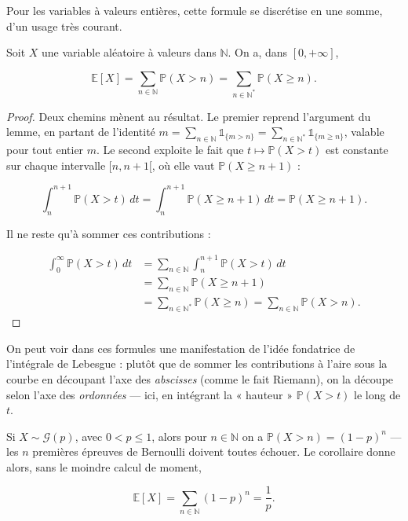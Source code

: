 Pour les variables à valeurs entières, cette formule se discrétise en une somme, d'un usage très courant.

\medskip

\begin{mdframed}
\begin{corollaire}
Soit $X$ une variable aléatoire à valeurs dans $\mathbb{N}$. On a, dans $[0, +\infty]$,

$$
\mathbb{E}[X] = \sum_{n \in \mathbb{N}} \mathbb{P}(X > n) = \sum_{n \in \mathbb{N}^*} \mathbb{P}(X \geq n).
$$
\end{corollaire}
\end{mdframed}

\begin{proof}
Deux chemins mènent au résultat. Le premier reprend l'argument du lemme, en partant de l'identité $m = \sum_{n \in \mathbb{N}} \mathbb{1}_{\{m > n\}} = \sum_{n \in \mathbb{N}^*} \mathbb{1}_{\{m \geq n\}}$, valable pour tout entier $m$. Le second exploite le fait que $t \mapsto \mathbb{P}(X > t)$ est constante sur chaque intervalle $[n, n+1[$, où elle vaut $\mathbb{P}(X \geq n + 1)$ :

$$
\int_n^{n+1} \mathbb{P}(X > t)\, dt = \int_n^{n+1} \mathbb{P}(X \geq n + 1)\, dt = \mathbb{P}(X \geq n + 1).
$$

Il ne reste qu'à sommer ces contributions :

\begin{align*}
\int_0^\infty \mathbb{P}(X > t)\, dt &= \sum_{n \in \mathbb{N}} \int_n^{n+1} \mathbb{P}(X > t)\, dt \\
&= \sum_{n \in \mathbb{N}} \mathbb{P}(X \geq n + 1) \\
&= \sum_{n \in \mathbb{N}^*} \mathbb{P}(X \geq n) = \sum_{n \in \mathbb{N}} \mathbb{P}(X > n).
\end{align*}
\end{proof}

On peut voir dans ces formules une manifestation de l'idée fondatrice de l'intégrale de Lebesgue : plutôt que de sommer les contributions à l'aire sous la courbe en découpant l'axe des \emph{abscisses} (comme le fait Riemann), on la découpe selon l'axe des \emph{ordonnées} — ici, en intégrant la « hauteur » $\mathbb{P}(X > t)$ le long de $t$.

\begin{exemple}
Si $X \sim \mathcal{G}(p)$, avec $0 < p \leq 1$, alors pour $n \in \mathbb{N}$ on a $\mathbb{P}(X > n) = (1 - p)^n$ — les $n$ premières épreuves de Bernoulli doivent toutes échouer. Le corollaire donne alors, sans le moindre calcul de moment,

$$
\mathbb{E}[X] = \sum_{n \in \mathbb{N}} (1 - p)^n = \frac{1}{p}.
$$
\end{exemple}

